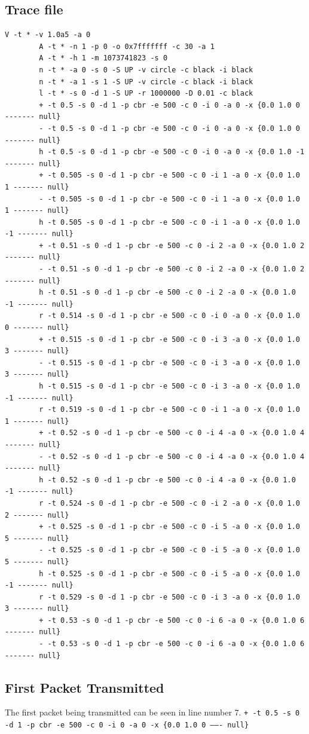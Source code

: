 \documentclass[12pt]{article}
\begin{document}
	\subsection{Trace file}
	
	\begin{lstlisting}[]
		V -t * -v 1.0a5 -a 0
		A -t * -n 1 -p 0 -o 0x7fffffff -c 30 -a 1
		A -t * -h 1 -m 1073741823 -s 0
		n -t * -a 0 -s 0 -S UP -v circle -c black -i black
		n -t * -a 1 -s 1 -S UP -v circle -c black -i black
		l -t * -s 0 -d 1 -S UP -r 1000000 -D 0.01 -c black
		+ -t 0.5 -s 0 -d 1 -p cbr -e 500 -c 0 -i 0 -a 0 -x {0.0 1.0 0 ------- null}
		- -t 0.5 -s 0 -d 1 -p cbr -e 500 -c 0 -i 0 -a 0 -x {0.0 1.0 0 ------- null}
		h -t 0.5 -s 0 -d 1 -p cbr -e 500 -c 0 -i 0 -a 0 -x {0.0 1.0 -1 ------- null}
		+ -t 0.505 -s 0 -d 1 -p cbr -e 500 -c 0 -i 1 -a 0 -x {0.0 1.0 1 ------- null}
		- -t 0.505 -s 0 -d 1 -p cbr -e 500 -c 0 -i 1 -a 0 -x {0.0 1.0 1 ------- null}
		h -t 0.505 -s 0 -d 1 -p cbr -e 500 -c 0 -i 1 -a 0 -x {0.0 1.0 -1 ------- null}
		+ -t 0.51 -s 0 -d 1 -p cbr -e 500 -c 0 -i 2 -a 0 -x {0.0 1.0 2 ------- null}
		- -t 0.51 -s 0 -d 1 -p cbr -e 500 -c 0 -i 2 -a 0 -x {0.0 1.0 2 ------- null}
		h -t 0.51 -s 0 -d 1 -p cbr -e 500 -c 0 -i 2 -a 0 -x {0.0 1.0 -1 ------- null}
		r -t 0.514 -s 0 -d 1 -p cbr -e 500 -c 0 -i 0 -a 0 -x {0.0 1.0 0 ------- null}
		+ -t 0.515 -s 0 -d 1 -p cbr -e 500 -c 0 -i 3 -a 0 -x {0.0 1.0 3 ------- null}
		- -t 0.515 -s 0 -d 1 -p cbr -e 500 -c 0 -i 3 -a 0 -x {0.0 1.0 3 ------- null}
		h -t 0.515 -s 0 -d 1 -p cbr -e 500 -c 0 -i 3 -a 0 -x {0.0 1.0 -1 ------- null}
		r -t 0.519 -s 0 -d 1 -p cbr -e 500 -c 0 -i 1 -a 0 -x {0.0 1.0 1 ------- null}
		+ -t 0.52 -s 0 -d 1 -p cbr -e 500 -c 0 -i 4 -a 0 -x {0.0 1.0 4 ------- null}
		- -t 0.52 -s 0 -d 1 -p cbr -e 500 -c 0 -i 4 -a 0 -x {0.0 1.0 4 ------- null}
		h -t 0.52 -s 0 -d 1 -p cbr -e 500 -c 0 -i 4 -a 0 -x {0.0 1.0 -1 ------- null}
		r -t 0.524 -s 0 -d 1 -p cbr -e 500 -c 0 -i 2 -a 0 -x {0.0 1.0 2 ------- null}
		+ -t 0.525 -s 0 -d 1 -p cbr -e 500 -c 0 -i 5 -a 0 -x {0.0 1.0 5 ------- null}
		- -t 0.525 -s 0 -d 1 -p cbr -e 500 -c 0 -i 5 -a 0 -x {0.0 1.0 5 ------- null}
		h -t 0.525 -s 0 -d 1 -p cbr -e 500 -c 0 -i 5 -a 0 -x {0.0 1.0 -1 ------- null}
		r -t 0.529 -s 0 -d 1 -p cbr -e 500 -c 0 -i 3 -a 0 -x {0.0 1.0 3 ------- null}
		+ -t 0.53 -s 0 -d 1 -p cbr -e 500 -c 0 -i 6 -a 0 -x {0.0 1.0 6 ------- null}
		- -t 0.53 -s 0 -d 1 -p cbr -e 500 -c 0 -i 6 -a 0 -x {0.0 1.0 6 ------- null}
	\end{lstlisting}

	\subsection{First Packet Transmitted}
	The first packet being transmitted can be seen in line number 7.
	\newline
	\texttt{+ -t 0.5 -s 0 -d 1 -p cbr -e 500 -c 0 -i 0 -a 0 -x \{0.0 1.0 0 ------- null\}}
	
\end{document}
